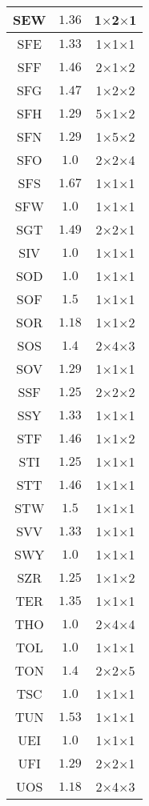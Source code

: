 \documentclass[main.tex]{subfiles}
\begin{document}
\begin{table}
{\begin{minipage}[t]{0.24\linewidth}
\begin{tabular}{|@{\hspace{2pt}}c@{\hspace{2pt}}|@{\hspace{2pt}}c@{\hspace{2pt}}|@{\hspace{2pt}}c@{\hspace{2pt}}|}
SEW&$1.36$&1$\times$2$\times$1\\\hline
SFE&$1.33$&1$\times$1$\times$1\\\hline
SFF&$1.46$&2$\times$1$\times$2\\\hline
SFG&$1.47$&1$\times$2$\times$2\\\hline
SFH&$1.29$&5$\times$1$\times$2\\\hline
SFN&$1.29$&1$\times$5$\times$2\\\hline
SFO&$1.0$&2$\times$2$\times$4\\\hline
SFS&$1.67$&1$\times$1$\times$1\\\hline
SFW&$1.0$&1$\times$1$\times$1\\\hline
SGT&$1.49$&2$\times$2$\times$1\\\hline
SIV&$1.0$&1$\times$1$\times$1\\\hline
SOD&$1.0$&1$\times$1$\times$1\\\hline
SOF&$1.5$&1$\times$1$\times$1\\\hline
SOR&$1.18$&1$\times$1$\times$2\\\hline
SOS&$1.4$&2$\times$4$\times$3\\\hline
SOV&$1.29$&1$\times$1$\times$1\\\hline
SSF&$1.25$&2$\times$2$\times$2\\\hline
SSY&$1.33$&1$\times$1$\times$1\\\hline
STF&$1.46$&1$\times$1$\times$2\\\hline
STI&$1.25$&1$\times$1$\times$1\\\hline
STT&$1.46$&1$\times$1$\times$1\\\hline
STW&$1.5$&1$\times$1$\times$1\\\hline
SVV&$1.33$&1$\times$1$\times$1\\\hline
SWY&$1.0$&1$\times$1$\times$1\\\hline
SZR&$1.25$&1$\times$1$\times$2\\\hline
TER&$1.35$&1$\times$1$\times$1\\\hline
THO&$1.0$&2$\times$4$\times$4\\\hline
TOL&$1.0$&1$\times$1$\times$1\\\hline
TON&$1.4$&2$\times$2$\times$5\\\hline
TSC&$1.0$&1$\times$1$\times$1\\\hline
TUN&$1.53$&1$\times$1$\times$1\\\hline
UEI&$1.0$&1$\times$1$\times$1\\\hline
UFI&$1.29$&2$\times$2$\times$1\\\hline
UOS&$1.18$&2$\times$4$\times$3\\\hline

\end{tabular}
\end{minipage}}
\end{table}
\end{document}

